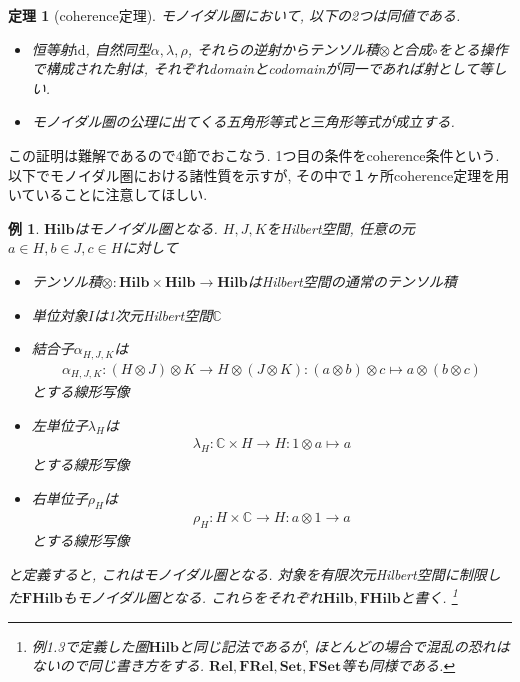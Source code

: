 \documentclass[a4paper,12pt]{ltjsarticle}
\theoremstyle{break}
\newtheorem{thrm}[thm]{定理}
\newtheorem{eg}[thm]{例}
\newcommand{\cset}{\mathbf{Set}}
\newcommand{\fset}{\mathbf{FSet}}
\newcommand{\rel}{\mathbf{Rel}}
\newcommand{\frel}{\mathbf{FRel}}
\newcommand{\hilb}{\mathbf{Hilb}}
\newcommand{\fhilb}{\mathbf{FHilb}}
\newcommand{\mbc}{\mathbb{C}}
\newcommand{\id}{\mathrm{id}}
\newcommand{\al}{\alpha}
\newcommand{\la}{\lambda}
\newcommand{\mt}{\mapsto}
\newcommand{\ot}{\otimes}
\newcommand{\ti}{\times}
\numberwithin{equation}{section}
\begin{document}
\begin{thrm}[coherence定理]
  モノイダル圏において, 以下の2つは同値である. 
  \begin{itemize}
    \item 恒等射$\id$, 自然同型$\al,\la,\rho$, それらの逆射からテンソル積$\ot$と合成$\circ$をとる操作で構成された射は, それぞれdomainとcodomainが同一であれば射として等しい. 
    \item モノイダル圏の公理に出てくる五角形等式と三角形等式が成立する. 
  \end{itemize}
\end{thrm}

この証明は難解であるので4節でおこなう. 
1つ目の条件をcoherence条件という. 
以下でモノイダル圏における諸性質を示すが, その中で１ヶ所coherence定理を用いていることに注意してほしい. 

\begin{eg}
  $\hilb$はモノイダル圏となる. 
  $H,J,K$をHilbert空間, 任意の元$a \in H, b \in J, c \in H$に対して 
  \begin{itemize}
    \item テンソル積$\ot : \hilb \ti \hilb \to \hilb$はHilbert空間の通常のテンソル積
    \item 単位対象$I$は1次元Hilbert空間$\mbc$
    \item 結合子$\al_{H,J,K}$は
    \begin{align*}
      \al_{H,J,K}: (H \ot J) \ot K \to H \ot (J \ot K): (a \ot b) \ot c \mt a \ot (b \ot c)
    \end{align*}
    とする線形写像
    \item 左単位子$\la_H$は
    \begin{align*}
      \la_H: \mbc \ti H \to H: 1 \ot a \mt a
    \end{align*}
    とする線形写像
    \item 右単位子$\rho_H$は
    \begin{align*}
      \rho_H: H \ti \mbc  \to H: a \ot 1 \to a
    \end{align*}
    とする線形写像
  \end{itemize}
  と定義すると, これはモノイダル圏となる. 
  対象を有限次元Hilbert空間に制限した$\fhilb$もモノイダル圏となる. 
  これらをそれぞれ$\hilb, \fhilb$と書く. 
  \footnote{
      例1.3で定義した圏$\hilb$と同じ記法であるが, ほとんどの場合で混乱の恐れはないので同じ書き方をする. 
      $\rel, \frel, \cset, \fset$等も同様である. 
    } 
\end{eg} 

\end{document}
